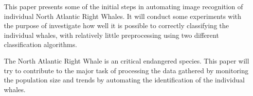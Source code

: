 This paper presents some of the initial steps in automating image recognition of individual North Atlantic Right Whales.
It will conduct some experiments with the purpose of investigate how well it is possible to correctly classifying the individual whales, with relatively little preprocessing using two different classification algorithms.

The North Atlantic Right Whale is an critical endangered species. 
This paper will try to contribute to the major task of processing the data gathered by monitoring the population size and trends by automating the identification of the individual whales.


